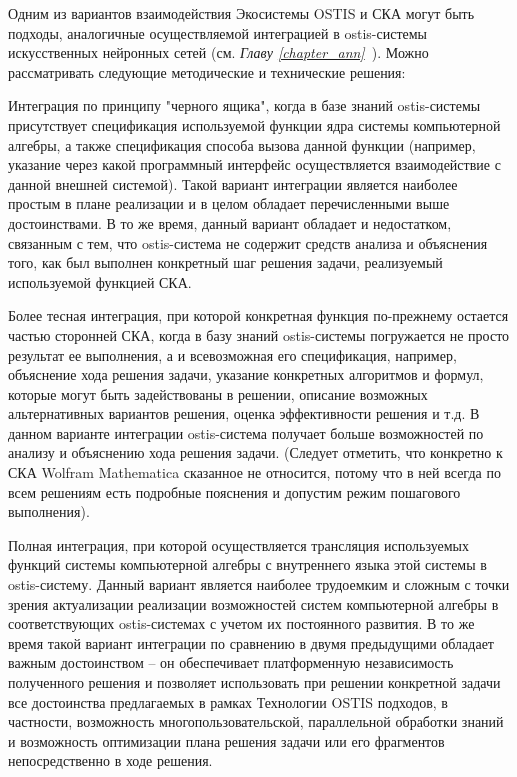 Одним из вариантов взаимодействия Экосистемы OSTIS и СКА могут быть подходы, аналогичные осуществляемой интеграцией в ostis-системы искусственных нейронных сетей (см. \textit{Главу \ref{chapter_ann}~}). Можно рассматривать следующие методические и технические решения:
\begin{textitemize}
	\item Интеграция по принципу "черного ящика"{}, когда в базе знаний ostis-системы присутствует спецификация используемой функции ядра системы компьютерной алгебры, а также спецификация способа вызова данной функции (например, указание через какой программный интерфейс осуществляется взаимодействие с данной внешней системой). Такой вариант интеграции является наиболее простым в плане реализации и в целом обладает перечисленными выше достоинствами. В то же время, данный вариант обладает и недостатком, связанным с тем, что ostis-система не содержит средств анализа и объяснения того, как был выполнен конкретный шаг решения задачи, реализуемый используемой функцией СКА.
	\item Более тесная интеграция, при которой конкретная функция по-прежнему остается частью сторонней СКА, когда в базу знаний ostis-системы погружается не просто результат ее выполнения, а и всевозможная его спецификация, например, объяснение хода решения задачи, указание конкретных алгоритмов и формул, которые могут быть задействованы в решении, описание возможных альтернативных вариантов решения, оценка эффективности решения и т.д. В данном варианте интеграции ostis-система получает больше возможностей по анализу и объяснению хода решения задачи. (Следует отметить, что конкретно к СКА Wolfram Mathematica сказанное не относится, потому что в ней всегда по всем решениям есть подробные пояснения и допустим режим пошагового выполнения).
	\item Полная интеграция, при которой осуществляется трансляция используемых функций системы компьютерной алгебры с внутреннего языка этой системы в ostis-систему. Данный вариант является наиболее трудоемким и сложным с точки зрения актуализации реализации возможностей систем компьютерной алгебры в соответствующих ostis-системах с учетом их постоянного развития. В то же время такой вариант интеграции по сравнению в двумя предыдущими обладает важным достоинством -- он обеспечивает платформенную независимость полученного решения и позволяет использовать при решении конкретной задачи все достоинства предлагаемых в рамках Технологии OSTIS подходов, в частности, возможность многопользовательской, параллельной обработки знаний и возможность оптимизации плана решения задачи или его фрагментов непосредственно в ходе решения.
\end{textitemize}

